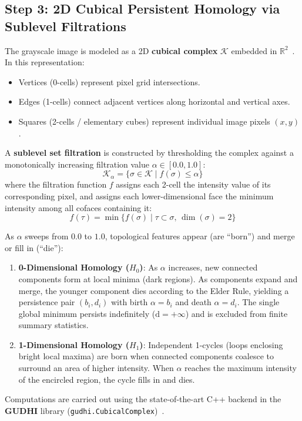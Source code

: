 \documentclass[11pt,a4paper]{article}
\begin{document}
\subsection{Step 3: 2D Cubical Persistent Homology via Sublevel Filtrations}
The grayscale image is modeled as a 2D \textbf{cubical complex} $\mathcal{K}$ embedded in $\mathbb{R}^2$~\cite{kaczynski2004computational}. In this representation:
\begin{itemize}[noitemsep]
    \item Vertices (0-cells) represent pixel grid intersections.
    \item Edges (1-cells) connect adjacent vertices along horizontal and vertical axes.
    \item Squares (2-cells / elementary cubes) represent individual image pixels $(x, y)$.
\end{itemize}

A \textbf{sublevel set filtration} is constructed by thresholding the complex against a monotonically increasing filtration value $\alpha \in [0.0, 1.0]$:
\begin{equation}
    \mathcal{K}_\alpha = \{ \sigma \in \mathcal{K} \mid f(\sigma) \le \alpha \}
\end{equation}
where the filtration function $f$ assigns each 2-cell the intensity value of its corresponding pixel, and assigns each lower-dimensional face the minimum intensity among all cofaces containing it:
\begin{equation}
    f(\tau) = \min \{ f(\sigma) \mid \tau \subset \sigma, \, \dim(\sigma) = 2 \}
\end{equation}

As $\alpha$ sweeps from $0.0$ to $1.0$, topological features appear (are ``born'') and merge or fill in (``die''):
\begin{enumerate}
    \item \textbf{0-Dimensional Homology ($H_0$)}: As $\alpha$ increases, new connected components form at local minima (dark regions). As components expand and merge, the younger component dies according to the Elder Rule, yielding a persistence pair $(b_i, d_i)$ with birth $\alpha = b_i$ and death $\alpha = d_i$. The single global minimum persists indefinitely ($\mathrm{d} = +\infty$) and is excluded from finite summary statistics.
    \item \textbf{1-Dimensional Homology ($H_1$)}: Independent 1-cycles (loops enclosing bright local maxima) are born when connected components coalesce to surround an area of higher intensity. When $\alpha$ reaches the maximum intensity of the encircled region, the cycle fills in and dies.
\end{enumerate}
Computations are carried out using the state-of-the-art C++ backend in the \textbf{GUDHI} library (\texttt{gudhi.CubicalComplex})~\cite{gudhi2024}.
\end{document}
